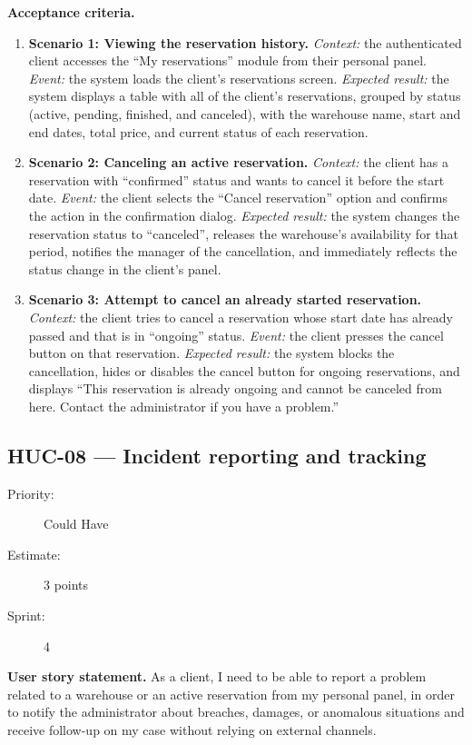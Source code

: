 \documentclass[11pt,a4paper,oneside]{report}
\begin{document}
\textbf{Acceptance criteria.}
\begin{enumerate}
\item \textbf{Scenario 1: Viewing the reservation history.} \emph{Context:} the authenticated client accesses the ``My reservations'' module from their personal panel. \emph{Event:} the system loads the client's reservations screen. \emph{Expected result:} the system displays a table with all of the client's reservations, grouped by status (active, pending, finished, and canceled), with the warehouse name, start and end dates, total price, and current status of each reservation.
\item \textbf{Scenario 2: Canceling an active reservation.} \emph{Context:} the client has a reservation with ``confirmed'' status and wants to cancel it before the start date. \emph{Event:} the client selects the ``Cancel reservation'' option and confirms the action in the confirmation dialog. \emph{Expected result:} the system changes the reservation status to ``canceled'', releases the warehouse's availability for that period, notifies the manager of the cancellation, and immediately reflects the status change in the client's panel.
\item \textbf{Scenario 3: Attempt to cancel an already started reservation.} \emph{Context:} the client tries to cancel a reservation whose start date has already passed and that is in ``ongoing'' status. \emph{Event:} the client presses the cancel button on that reservation. \emph{Expected result:} the system blocks the cancellation, hides or disables the cancel button for ongoing reservations, and displays ``This reservation is already ongoing and cannot be canceled from here. Contact the administrator if you have a problem.''
\end{enumerate}

\subsection{HUC-08 --- Incident reporting and tracking}
\label{req:HUC-08}
\begin{description}
\item[Priority:] Could Have \quad \item[Estimate:] 3 points \quad \item[Sprint:] 4
\end{description}

\textbf{User story statement.} As a client, I need to be able to report a problem related to a warehouse or an active reservation from my personal panel, in order to notify the administrator about breaches, damages, or anomalous situations and receive follow-up on my case without relying on external channels.
\end{document}

